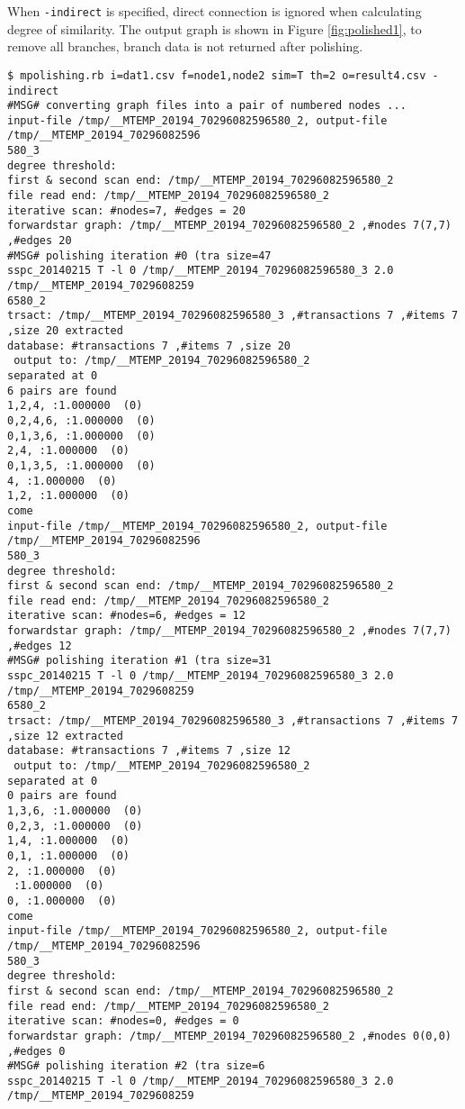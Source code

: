 When \verb|-indirect| is specified, direct connection is ignored when calculating degree of similarity.
The output graph is shown in Figure \ref{fig:polished1}, to remove all branches, branch data is not returned after polishing.


\begin{Verbatim}[baselinestretch=0.7,frame=single]
$ mpolishing.rb i=dat1.csv f=node1,node2 sim=T th=2 o=result4.csv -indirect
#MSG# converting graph files into a pair of numbered nodes ...
input-file /tmp/__MTEMP_20194_70296082596580_2, output-file /tmp/__MTEMP_20194_70296082596
580_3
degree threshold: 
first & second scan end: /tmp/__MTEMP_20194_70296082596580_2
file read end: /tmp/__MTEMP_20194_70296082596580_2
iterative scan: #nodes=7, #edges = 20
forwardstar graph: /tmp/__MTEMP_20194_70296082596580_2 ,#nodes 7(7,7) ,#edges 20
#MSG# polishing iteration #0 (tra size=47
sspc_20140215 T -l 0 /tmp/__MTEMP_20194_70296082596580_3 2.0 /tmp/__MTEMP_20194_7029608259
6580_2
trsact: /tmp/__MTEMP_20194_70296082596580_3 ,#transactions 7 ,#items 7 ,size 20 extracted 
database: #transactions 7 ,#items 7 ,size 20
 output to: /tmp/__MTEMP_20194_70296082596580_2
separated at 0
6 pairs are found
1,2,4, :1.000000  (0)
0,2,4,6, :1.000000  (0)
0,1,3,6, :1.000000  (0)
2,4, :1.000000  (0)
0,1,3,5, :1.000000  (0)
4, :1.000000  (0)
1,2, :1.000000  (0)
come
input-file /tmp/__MTEMP_20194_70296082596580_2, output-file /tmp/__MTEMP_20194_70296082596
580_3
degree threshold: 
first & second scan end: /tmp/__MTEMP_20194_70296082596580_2
file read end: /tmp/__MTEMP_20194_70296082596580_2
iterative scan: #nodes=6, #edges = 12
forwardstar graph: /tmp/__MTEMP_20194_70296082596580_2 ,#nodes 7(7,7) ,#edges 12
#MSG# polishing iteration #1 (tra size=31
sspc_20140215 T -l 0 /tmp/__MTEMP_20194_70296082596580_3 2.0 /tmp/__MTEMP_20194_7029608259
6580_2
trsact: /tmp/__MTEMP_20194_70296082596580_3 ,#transactions 7 ,#items 7 ,size 12 extracted 
database: #transactions 7 ,#items 7 ,size 12
 output to: /tmp/__MTEMP_20194_70296082596580_2
separated at 0
0 pairs are found
1,3,6, :1.000000  (0)
0,2,3, :1.000000  (0)
1,4, :1.000000  (0)
0,1, :1.000000  (0)
2, :1.000000  (0)
 :1.000000  (0)
0, :1.000000  (0)
come
input-file /tmp/__MTEMP_20194_70296082596580_2, output-file /tmp/__MTEMP_20194_70296082596
580_3
degree threshold: 
first & second scan end: /tmp/__MTEMP_20194_70296082596580_2
file read end: /tmp/__MTEMP_20194_70296082596580_2
iterative scan: #nodes=0, #edges = 0
forwardstar graph: /tmp/__MTEMP_20194_70296082596580_2 ,#nodes 0(0,0) ,#edges 0
#MSG# polishing iteration #2 (tra size=6
sspc_20140215 T -l 0 /tmp/__MTEMP_20194_70296082596580_3 2.0 /tmp/__MTEMP_20194_7029608259

\end{Verbatim}
